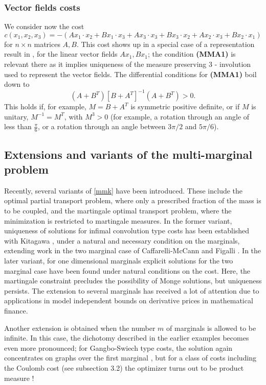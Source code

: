 \documentclass[letter,10pt]{article}
\theoremstyle{dotless}
\begin{document}
\subsubsection{Vector fields costs}
We consider now the cost 
\begin{equation*}
c(x_1,x_2,x_3) = -(Ax_1 \cdot x_2 +Bx_1 \cdot x_3 + Ax_3 \cdot x_3 +Bx_3 \cdot x_2 +Ax_2 \cdot x_3 +Bx_2 \cdot x_1)
\end{equation*}
for $n \times n$ matrices $A,B$.  This cost shows up in a special case of a representation result in \cite{GhM}, for the linear vector fields $Ax_1, Bx_1$; the condition \textbf{(MMA1)} is relevant there as it implies uniqueness of the measure preserving $3$ - involution used to represent the vector fields.  The differential conditions for \textbf{(MMA1)} boil down to
\begin{equation*}
(A+B^T)[B+A^T]^{-1}(A+B^T)>0.
\end{equation*}
This holds if, for example, $M =B+A^T$ is symmetric positive definite, or if $M$ is unitary, $M^{-1}=M^T$, with $M^3 >0$  (for example, a rotation through an angle of less than $\frac{\pi}{6}$, or a rotation through an angle between $3\pi/2$ and $5\pi/6$).
\subsection{Extensions and variants of the multi-marginal problem}
Recently, several variants of \eqref{mmk} have been introduced.  These include the optimal partial transport problem, where only a prescribed fraction of the mass is to be coupled, and the martingale optimal transport problem, where the minimization is restricted to martingale measures.  In the former variant, uniqueness of solutions for infimal convolution type costs has been established with Kitagawa \cite{KitPass}, under a natural and necessary condition on the marginals, extending work in the two marginal case of Caffarelli-McCann \cite{CM10} and Figalli \cite{Fig10a}.  In the later variant, for one dimensional marginals explicit solutions for the two marginal case have been found \cite{bj} \cite{hpt} under natural conditions on the cost.  Here, the martingale constraint precludes the possibility of Monge solutions, but uniqueness persists.  The extension to several marginals has received a lot of attention due to applications in model independent bounds on derivative prices in mathematical finance.

Another extension is obtained when the number $m$ of marginals is allowed to be infinite.  In this case, the dichotomy described in the earlier examples becomes even more pronounced; for Gangbo-Swiech type costs, the solution again concentrates on graphs over the first marginal \cite{P5,P6}, but for a class of costs including the Coulomb cost (see subsection 3.2) the optimizer turns out to be product measure \cite{CFP}! 
\end{document}

